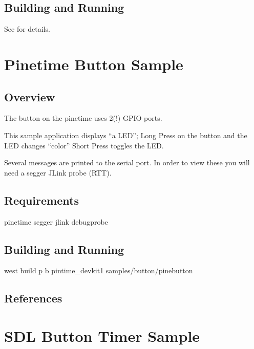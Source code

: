 \documentclass[letterpaper,10pt,english]{sphinxmanual}
\begin{document}
\subsection{Building and Running}
\label{\detokenize{samples/samplesbluetoothperipheralREADME:building-and-running}}
See  for details.


\section{Pinetime  Button  Sample}
\label{\detokenize{samples/samplesbuttonpinebuttonREADME:pinetime-button-sample}}\label{\detokenize{samples/samplesbuttonpinebuttonREADME:pinebutton-sample}}\label{\detokenize{samples/samplesbuttonpinebuttonREADME::doc}}

\subsection{Overview}
\label{\detokenize{samples/samplesbuttonpinebuttonREADME:overview}}
The button on the pinetime uses 2(!) GPIO ports.

This sample application displays “a LED”;
Long Press on the button and the LED changes “color”
Short Press toggles the LED.

Several messages are printed to the serial port.
In order to view these you will need a segger JLink probe (RTT).


\subsection{Requirements}
\label{\detokenize{samples/samplesbuttonpinebuttonREADME:requirements}}
pinetime
segger jlink debugprobe


\subsection{Building and Running}
\label{\detokenize{samples/samplesbuttonpinebuttonREADME:building-and-running}}
west build \sphinxhyphen{}p \sphinxhyphen{}b pintime\_devkit1  samples/button/pinebutton


\subsection{References}
\label{\detokenize{samples/samplesbuttonpinebuttonREADME:references}}

\section{SDL Button Timer  Sample}
\label{\detokenize{samples/samplesbuttonsdlbutton2README:sdl-button-timer-sample}}\label{\detokenize{samples/samplesbuttonsdlbutton2README:sdlb-sample}}\label{\detokenize{samples/samplesbuttonsdlbutton2README::doc}}
\end{document}
